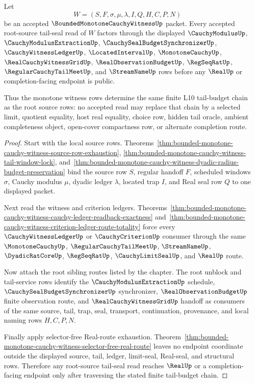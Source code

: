 \begin{theorem}
\label{thm:bounded-monotone-cauchy-witness-root-tail-budget-exactness}
Let
$$
W=(S,F,\sigma,\mu,\lambda,I,Q,H,C,P,N)
$$
be an accepted $\BoundedMonotoneCauchyWitnessUp$ packet. Every accepted root-source tail-seal read of $W$ factors through the displayed $\CauchyModulusUp$, $\CauchyModulusExtractionUp$, $\CauchySealBudgetSynchronizerUp$, $\CauchyWitnessLedgerUp$, $\LocatedIntervalUp$, $\MonotoneCauchyUp$, $\RealCauchyWitnessGridUp$, $\RealObservationBudgetUp$, $\RegSeqRatUp$, $\RegularCauchyTailMeetUp$, and $\StreamNameUp$ rows before any $\RealUp$ or completion-facing endpoint is public.

Thus the monotone witness rows determine the same finite L10 tail-budget chain as the root source rows: no accepted read may replace that chain by a selected limit, quotient equality, host real equality, choice row, hidden tail oracle, ambient completeness object, open-cover compactness row, or alternate completion route.
\end{theorem}
\begin{proof}
Start with the local source rows. Theorems~\ref{thm:bounded-monotone-cauchy-witness-source-row-exhaustion}, \ref{thm:bounded-monotone-cauchy-witness-tail-window-lock}, and~\ref{thm:bounded-monotone-cauchy-witness-dyadic-radius-budget-preservation} bind the source row $S$, regular handoff $F$, scheduled windows $\sigma$, Cauchy modulus $\mu$, dyadic ledger $\lambda$, located trap $I$, and Real seal row $Q$ to one displayed packet.

Next read the witness and criterion ledgers. Theorems~\ref{thm:bounded-monotone-cauchy-witness-cauchy-ledger-readback-exactness} and~\ref{thm:bounded-monotone-cauchy-witness-criterion-ledger-route-totality} force every $\CauchyWitnessLedgerUp$ or $\CauchyCriterionUp$ consumer through the same $\MonotoneCauchyUp$, $\RegularCauchyTailMeetUp$, $\StreamNameUp$, $\DyadicRatCoreUp$, $\RegSeqRatUp$, $\CauchyLimitSealUp$, and $\RealUp$ route.

Now attach the root sibling routes listed by the chapter. The root unblock and tail-service rows identify the $\CauchyModulusExtractionUp$ schedule, $\CauchySealBudgetSynchronizerUp$ synchronizer, $\RealObservationBudgetUp$ finite observation route, and $\RealCauchyWitnessGridUp$ handoff as consumers of the same source, tail, trap, seal, transport, continuation, provenance, and local naming rows $H,C,P,N$.

Finally apply selector-free Real-route exhaustion. Theorem~\ref{thm:bounded-monotone-cauchy-witness-selector-free-real-route} leaves no endpoint coordinate outside the displayed source, tail, ledger, limit-seal, Real-seal, and structural rows. Therefore any root-source tail-seal read reaches $\RealUp$ or a completion-facing endpoint only after traversing the stated finite tail-budget chain.
\end{proof}

